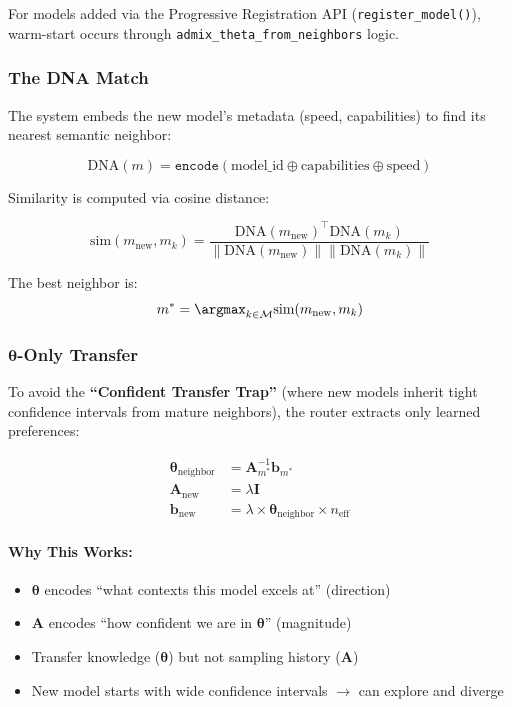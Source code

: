 \documentclass[sigconf]{acmart}
\begin{document}
For models added via the Progressive Registration API (\texttt{register\_model()}), warm-start occurs through \texttt{admix\_theta\_from\_neighbors} logic.

\subsubsection{The DNA Match}

The system embeds the new model's metadata (speed, capabilities) to find its nearest semantic neighbor:

\begin{equation}
\text{DNA}(m) = \texttt{encode}\left(\text{model\_id} \oplus \text{capabilities} \oplus \text{speed}\right)
\end{equation}

Similarity is computed via cosine distance:

\begin{equation}
\text{sim}(m_{\text{new}}, m_k) = \frac{\text{DNA}(m_{\text{new}})^\top \text{DNA}(m_k)}{\|\text{DNA}(m_{\text{new}})\| \|\text{DNA}(m_k)\|}
\end{equation}

The best neighbor is:
\begin{equation}
m^* = \argmax_{k \in \mathcal{M}} \text{sim}(m_{\text{new}}, m_k)
\end{equation}

\subsubsection{$\boldsymbol{\theta}$-Only Transfer}

To avoid the \textbf{``Confident Transfer Trap''} (where new models inherit tight confidence intervals from mature neighbors), the router extracts only learned preferences:

\begin{align}
\boldsymbol{\theta}_{\text{neighbor}} &= \mathbf{A}_{m^*}^{-1} \mathbf{b}_{m^*} \label{eq:extract_theta} \\
\mathbf{A}_{\text{new}} &= \lambda \mathbf{I} \label{eq:reset_A} \\
\mathbf{b}_{\text{new}} &= \lambda \times \boldsymbol{\theta}_{\text{neighbor}} \times n_{\text{eff}} \label{eq:scale_b}
\end{align}

\paragraph{Why This Works:}
\begin{itemize}
    \item $\boldsymbol{\theta}$ encodes ``what contexts this model excels at'' (direction)
    \item $\mathbf{A}$ encodes ``how confident we are in $\boldsymbol{\theta}$'' (magnitude)
    \item Transfer knowledge ($\boldsymbol{\theta}$) but not sampling history ($\mathbf{A}$)
    \item New model starts with wide confidence intervals $\rightarrow$ can explore and diverge
\end{itemize}
\end{document}
